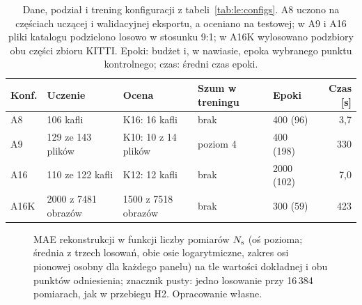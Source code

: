 \begin{table}[htbp]
\centering
\caption[Dane, podział i trening konfiguracji autoenkodera]{Dane, podział i trening konfiguracji z tabeli~\ref{tab:le:configs}. A8 uczono na częściach uczącej i walidacyjnej eksportu, a oceniano na testowej; w A9 i A16 pliki katalogu podzielono losowo w stosunku 9:1; w A16K wylosowano podzbiory obu części zbioru KITTI. Epoki: budżet i, w nawiasie, epoka wybranego punktu kontrolnego; czas: średni czas epoki.}
\label{tab:le:data}
\footnotesize
\setlength{\tabcolsep}{5pt}
\begin{tabular}{@{}lllllr@{}}
\toprule
Konf. & Uczenie & Ocena & Szum w treningu & Epoki & Czas [s] \\
\midrule
A8 & 106 kafli & K16: 16 kafli & brak & 400 (96) & 3,7 \\
A9 & 129 ze 143 plików & K10: 10 z 14 plików & poziom 4 & 400 (198) & 330 \\
A16 & 110 ze 122 kafli & K12: 12 kafli & brak & 2000 (102) & 7,0 \\
A16K & 2000 z 7481 obrazów & 1500 z 7518 obrazów & brak & 300 (59) & 423 \\
\bottomrule
\end{tabular}
\end{table}

\begin{figure}[htbp]
\centering

\caption[Błąd rekonstrukcji w funkcji liczby pomiarów]{MAE rekonstrukcji w funkcji liczby pomiarów $N_{\mathrm{s}}$ (oś pozioma; średnia z trzech losowań, obie osie logarytmiczne, zakres osi pionowej osobny dla każdego panelu) na tle wartości dokładnej i obu punktów odniesienia; znacznik pusty: jedno losowanie przy 16\,384 pomiarach, jak w przebiegu H2. Opracowanie własne.}
\label{fig:le:shots}
\end{figure}


